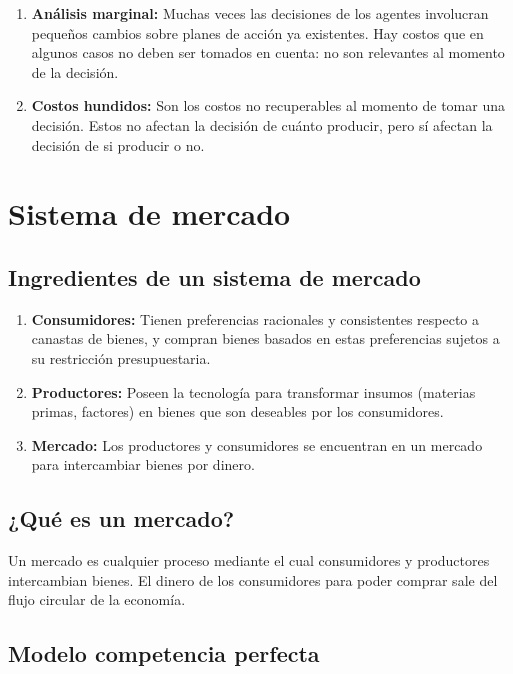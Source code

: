 \documentclass{report}
\begin{document}
\begin{enumerate}
\item \textbf{Análisis marginal:} Muchas veces las decisiones de los agentes involucran pequeños cambios sobre planes de acción ya existentes. Hay costos que en algunos casos no deben ser tomados en cuenta: no son relevantes al momento de la decisión.
\item \textbf{Costos hundidos:} Son los costos no recuperables al momento de tomar una decisión. Estos no afectan la decisión de cuánto producir, pero sí afectan la decisión de si producir o no.
\end{enumerate}

\section{Sistema de mercado}

\subsection{Ingredientes de un sistema de mercado}

\begin{enumerate}
\item \textbf{Consumidores:} Tienen preferencias racionales y consistentes respecto a canastas de bienes, y compran bienes basados en estas preferencias sujetos a su restricción presupuestaria.
\item \textbf{Productores:} Poseen la tecnología para transformar insumos (materias primas, factores) en bienes que son deseables por los consumidores.
\item \textbf{Mercado:} Los productores y consumidores se encuentran en un mercado para intercambiar bienes por dinero.
\end{enumerate}

\subsection{¿Qué es un mercado?}

Un mercado es cualquier proceso mediante el cual consumidores y productores intercambian bienes. El dinero de los consumidores para poder comprar sale del flujo circular de la economía.

\subsection{Modelo competencia perfecta}
\end{document}
